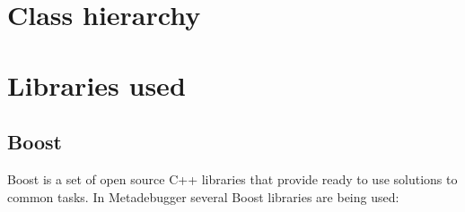 \section{Class hierarchy}


\section{Libraries used}

\subsection*{Boost\cite{boost}}

Boost is a set of open source C++ libraries that provide ready to use solutions
to common tasks. In Metadebugger several Boost libraries are being used:
